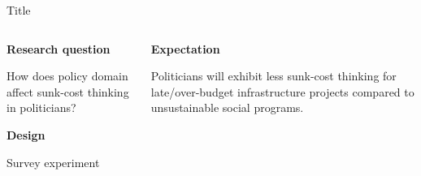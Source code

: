\begin{frame}{Title}

\begin{columns}
  \begin{column}[T]{0.4\textwidth}
    \textbf{Research question}

    \vspace{0.2cm}

    How does policy domain affect sunk-cost thinking in politicians?
    
    \vspace{0.2cm}

    \textbf{Design}
    
    \vspace{0.2cm}

    Survey experiment
    
  \end{column}

  \begin{column}[T]{0.5\textwidth}

    \textbf{Expectation}

    Politicians will exhibit less sunk-cost thinking for late/over-budget infrastructure projects compared to unsustainable social programs.




    \vspace{0.2cm}
  \end{column}
\end{columns}


\end{frame}
